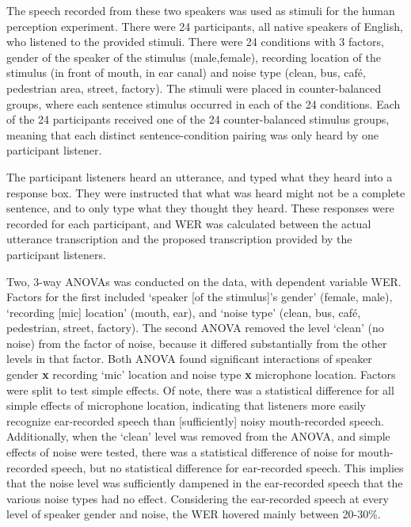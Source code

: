 The speech recorded from these two speakers was used as stimuli for the human perception experiment.  There were 24 participants, all native speakers of English, who listened to the provided stimuli.  There were 24 conditions with 3 factors, gender of the speaker of the stimulus (male,female), recording location of the stimulus (in front of mouth, in ear canal) and noise type (clean, bus, caf\'{e}, pedestrian area, street, factory).  The stimuli were placed in counter-balanced groups, where each sentence stimulus occurred in each of the 24 conditions.  Each of the 24 participants received one of the 24 counter-balanced stimulus groups, meaning that each distinct sentence-condition pairing was only heard by one participant listener.

The participant listeners heard an utterance, and typed what they heard into a response box.  They were instructed that what was heard might not be a complete sentence, and to only type what they thought they heard.  These responses were recorded for each participant, and WER was calculated between the actual utterance transcription and the proposed transcription provided by the participant listeners.

Two, 3-way ANOVAs was conducted on the data, with dependent variable WER.  Factors for the first included `speaker [of the stimulus]'s gender' (female, male), `recording [mic] location' (mouth, ear), and `noise type' (clean, bus, caf\'{e}, pedestrian, street, factory).  The second ANOVA removed the level `clean' (no noise) from the factor of noise, because it differed substantially from the other levels in that factor.  Both ANOVA found significant interactions of speaker gender \textbf{x} recording `mic' location and noise type \textbf{x} microphone location.  Factors were split to test simple effects.  Of note, there was a statistical difference for all simple effects of microphone location, indicating that listeners more easily recognize ear-recorded speech than [sufficiently] noisy mouth-recorded speech.  Additionally, when the `clean' level was removed from the ANOVA, and simple effects of noise were tested, there was a statistical difference of noise for mouth-recorded speech, but no statistical difference for ear-recorded speech.  This implies that the noise level was sufficiently dampened in the ear-recorded speech that the various noise types had no effect.  Considering the ear-recorded speech at every level of speaker gender and noise, the WER hovered mainly between 20-30\%.

